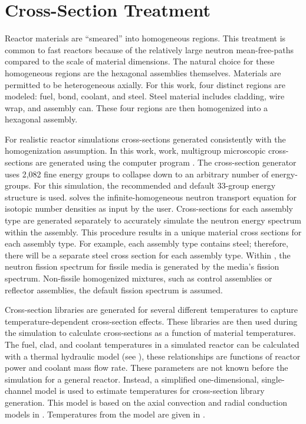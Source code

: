 \section{Cross-Section Treatment}
  \label{sec:cross_section_treatment}
  Reactor materials are ``smeared'' into homogeneous regions. This treatment is
  common to fast reactors because of the relatively large neutron
  mean-free-paths compared to the scale of material dimensions. The natural
  choice for these homogeneous regions are the hexagonal assemblies themselves.
  Materials are permitted to be heterogeneous axially.  For this work, four
  distinct regions are modeled: fuel, bond, coolant, and steel. Steel material
  includes cladding, wire wrap, and assembly can. These four regions are then
  homogenized into a hexagonal assembly.

  For realistic reactor simulations cross-sections generated consistently with
  the homogenization assumption. In this work, work, multigroup microscopic
  cross-sections are generated using the computer program \mcc \cite{mcc}.  The
  cross-section generator uses 2,082 fine energy groups to collapse down to an
  arbitrary number of energy-groups. For this simulation, the recommended and
  default 33-group energy structure is used. \mcc solves the
  infinite-homogeneous neutron transport equation for isotopic number densities
  as input by the user.  Cross-sections for each assembly type are generated
  separately to accurately simulate the neutron energy spectrum within the
  assembly. This procedure results in a unique material cross sections for each
  assembly type. For example, each assembly type contains steel; therefore,
  there will be a separate steel cross section for each assembly type. Within
  \mcc, the neutron fission  spectrum for fissile media is generated by the
  media's fission spectrum.  Non-fissile homogenized mixtures, such as control
  assemblies or reflector assemblies, the default  fission
  spectrum is assumed.

  Cross-section libraries are generated for several different temperatures to
  capture temperature-dependent cross-section effects. These libraries are then
  used during the simulation to calculate cross-sections as a function of
  material temperatures.  The fuel, clad, and coolant temperatures in a
  simulated reactor can be calculated with a thermal hydraulic model (see
  ), these relationships are functions of reactor
  power and coolant mass flow rate. These parameters are not known before the
  simulation for a general reactor. Instead, a simplified one-dimensional,
  single-channel model is used to estimate temperatures for cross-section
  library generation. This model is based on the axial convection and radial
  conduction models in . Temperatures from the model
  are given in .

